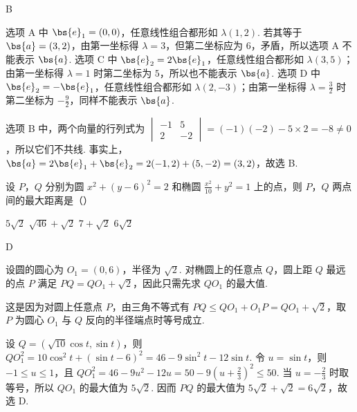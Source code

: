 \begin{answer}
B
\end{answer}

\begin{solution}
选项 A 中 \(\bs{e}_1=(0,0)\)，任意线性组合都形如 \(\lambda(1,2)\). 若其等于 \(\bs{a}=(3,2)\)，由第一坐标得 \(\lambda=3\)，但第二坐标应为 \(6\)，矛盾，所以选项 A 不能表示 \(\bs{a}\). 选项 C 中 \(\bs{e}_2=2\bs{e}_1\)，任意线性组合都形如 \(\lambda(3,5)\)；由第一坐标得 \(\lambda=1\) 时第二坐标为 \(5\)，所以也不能表示 \(\bs{a}\). 选项 D 中 \(\bs{e}_2=-\bs{e}_1\)，任意线性组合都形如 \(\lambda(2,-3)\)；由第一坐标得 \(\lambda=\frac{3}{2}\) 时第二坐标为 \(-\frac{9}{2}\)，同样不能表示 \(\bs{a}\).

选项 B 中，两个向量的行列式为 \(\begin{vmatrix}-1&5\\2&-2\end{vmatrix}=(-1)(-2)-5\times2=-8\neq0\)，所以它们不共线. 事实上，\(\bs{a}=2\bs{e}_1+\bs{e}_2=2(-1,2)+(5,-2)=(3,2)\)，故选 B.
\end{solution}

\begin{problem}
设 \(P\)，\(Q\) 分别为圆 \(x^{2} + (y - 6)^{2} = 2\) 和椭圆 \(\frac{x^2}{10} + y^2 = 1\) 上的点，则 \(P\)，\(Q\) 两点间的最大距离是（\quad）

\choices
    {\(5\sqrt{2}\)}
    {\(\sqrt{46} + \sqrt{2}\)}
    {\(7 + \sqrt{2}\)}
    {\(6\sqrt{2}\)}
\end{problem}

\begin{answer}
D
\end{answer}

\begin{solution}
设圆的圆心为 \(O_1=(0,6)\)，半径为 \(\sqrt{2}\). 对椭圆上的任意点 \(Q\)，圆上距 \(Q\) 最远的点 \(P\) 满足 \(PQ=QO_1+\sqrt{2}\)，因此只需先求 \(QO_1\) 的最大值.

这是因为对圆上任意点 \(P\)，由三角不等式有 \(PQ\leqslant QO_1+O_1P=QO_1+\sqrt{2}\)，取 \(P\) 为圆心 \(O_1\) 与 \(Q\) 反向的半径端点时等号成立.

设 \(Q=(\sqrt{10}\cos t,\sin t)\)，则
\(QO_1^2=10\cos^2t+(\sin t-6)^2=46-9\sin^2t-12\sin t\).
令 \(u=\sin t\)，则 \(-1\leqslant u\leqslant1\)，且
\(QO_1^2=46-9u^2-12u=50-9\left(u+\frac{2}{3}\right)^2\leqslant50\).
当 \(u=-\frac{2}{3}\) 时取等号，所以 \(QO_1\) 的最大值为 \(5\sqrt{2}\). 因而 \(PQ\) 的最大值为 \(5\sqrt{2}+\sqrt{2}=6\sqrt{2}\)，故选 D.
\end{solution}

